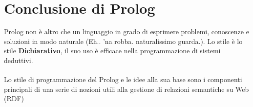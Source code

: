 \documentclass[12pt, a4paper, openany, oneside]{book}
\begin{document}
\chapter*{Conclusione di Prolog}
Prolog non è altro che un linguaggio in grado di esprimere problemi, conoscenze
e soluzioni in modo naturale (Eh.. 'na robba. naturalissimo guarda.). Lo stile
è lo stile \textbf{Dichiarativo}, il suo uso è efficace nella programmazione di 
sistemi deduttivi.\\ \\
Lo stile di programmazione del Prolog e le idee alla sua base sono i componenti 
principali di una serie di nozioni utili alla gestione di relazioni semantiche
su Web (RDF)
\end{document}
